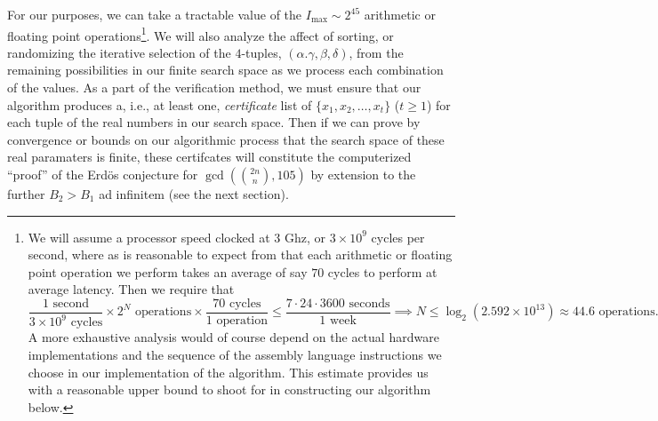 \documentclass[12pt]{article}
\begin{document}
For our purposes, we can take a tractable value of the $I_{\max} \sim 2^{45}$ arithmetic or floating point 
operations\footnote{ 
     We will assume a processor speed clocked at 3 Ghz, or $3 \times 10^9$ cycles per second, 
     where as is reasonable to expect from 
     \cite{INST-TABLES-REF} that each arithmetic or floating point operation we perform takes an 
     average of say $70$ cycles to perform at average latency. Then we require that 
     \[
     \frac{1\text{ second}}{3 \times 10^9 \text{ cycles}} \times 2^N \text{ operations} \times 
          \frac{70\text{ cycles}}{1\text{ operation}} \leq \frac{7 \cdot 24 \cdot 3600 \text{ seconds}}{ 
          1\text{ week}} \implies 
          N \leq \log_2(2.592 \times 10^{13}) \approx 44.6 \text{ operations}. 
     \] 
     A more exhaustive analysis would of course depend on the actual hardware implementations and the 
     sequence of the assembly language instructions we choose in our implementation of the 
     algorithm. This estimate provides us with a reasonable upper bound to shoot for in 
     constructing our algorithm below. 
}. We will also analyze the affect of sorting, or randomizing the iterative selection of the 
$4$-tuples, $(\alpha.\gamma,\beta,\delta)$, from the remaining possibilities in our finite search space 
as we process each combination of the values. As a part of the verification method, we must ensure that 
our algorithm produces a, i.e., at least one, 
\emph{certificate} list of $\{x_1,x_2,\ldots,x_t\}$ ($t \geq 1$) for each tuple of the real numbers in 
our search space. Then if we can prove by convergence or bounds on our algorithmic process that the 
search space of these real paramaters is finite, these certifcates will constitute the 
computerized ``proof'' of the Erd\"os conjecture for $\gcd(\binom{2n}{n}, 105)$ by extension to the 
further $B_2 > B_1$ ad infinitem (see the next section). 
\end{document}
